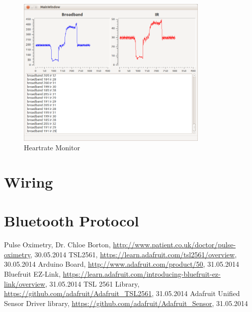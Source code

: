 \documentclass[fontsize=12pt,toc=bibliography, notitlepage]{scrreprt}
\begin{document}
\begin{figure}[H]
	\centering
	\includegraphics[width=350px]{images/hrm.png}
	\caption{Heartrate Monitor}
	\label{fig:heartrate-monitor}
\end{figure}

\section{Wiring}
\label{sec:wiring}

\section{Bluetooth Protocol}
\label{sec:bluetooth-protocol}

\begin{thebibliography}{999}
	 Pulse Oximetry, Dr. Chloe Borton, \url{http://www.patient.co.uk/doctor/pulse-oximetry}, 30.05.2014
	 TSL2561, \url{https://learn.adafruit.com/tsl2561/overview}, 30.05.2014
	 Arduino Board, \url{http://www.adafruit.com/product/50}, 31.05.2014
	 Bluefruit EZ-Link, \url{https://learn.adafruit.com/introducing-bluefruit-ez-link/overview}, 31.05.2014
	 TSL 2561 Library, \url{https://github.com/adafruit/Adafruit_TSL2561}, 31.05.2014
	 Adafruit Unified Sensor Driver library, \url{https://github.com/adafruit/Adafruit_Sensor}, 31.05.2014
\end{thebibliography}

\cleardoublepage
{}
\listoffigures
\end{document}
